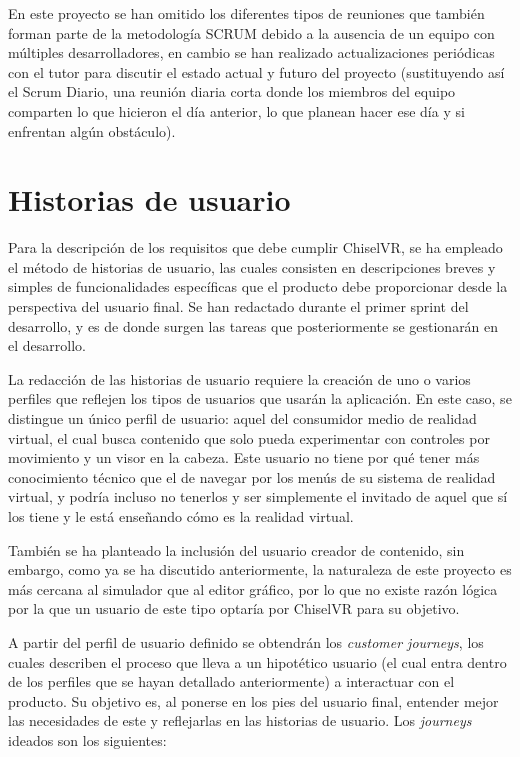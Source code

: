 En este proyecto se han omitido los diferentes tipos de reuniones que también forman parte de la metodología SCRUM debido a la ausencia de un equipo con múltiples desarrolladores, en cambio se han realizado actualizaciones periódicas con el tutor para discutir el estado actual y futuro del proyecto (sustituyendo así el Scrum Diario, una reunión diaria corta donde los miembros del equipo comparten lo que hicieron el día anterior, lo que planean hacer ese día y si enfrentan algún obstáculo).

\section{Historias de usuario}

Para la descripción de los requisitos que debe cumplir ChiselVR, se ha empleado el método de historias de usuario, las cuales consisten en descripciones breves y simples de funcionalidades específicas que el producto debe proporcionar desde la perspectiva del usuario final. Se han redactado durante el primer sprint del desarrollo, y es de donde surgen las tareas que posteriormente se gestionarán en el desarrollo.

La redacción de las historias de usuario requiere la creación de uno o varios perfiles que reflejen los tipos de usuarios que usarán la aplicación. En este caso, se distingue un único perfil de usuario: aquel del consumidor medio de realidad virtual, el cual busca contenido que solo pueda experimentar con controles por movimiento y un visor en la cabeza. Este usuario no tiene por qué tener más conocimiento técnico que el de navegar por los menús de su sistema de realidad virtual, y podría incluso no tenerlos y ser simplemente el invitado de aquel que sí los tiene y le está enseñando cómo es la realidad virtual.

También se ha planteado la inclusión del usuario creador de contenido, sin embargo, como ya se ha discutido anteriormente, la naturaleza de este proyecto es más cercana al simulador que al editor gráfico, por lo que no existe razón lógica por la que un usuario de este tipo optaría por ChiselVR para su objetivo.

A partir del perfil de usuario definido se obtendrán los \textit{customer journeys}, los cuales describen el proceso que lleva a un hipotético usuario (el cual entra dentro de los perfiles que se hayan detallado anteriormente) a interactuar con el producto. Su objetivo es, al ponerse en los pies del usuario final, entender mejor las necesidades de este y reflejarlas en las historias de usuario. Los \textit{journeys} ideados son los siguientes:

